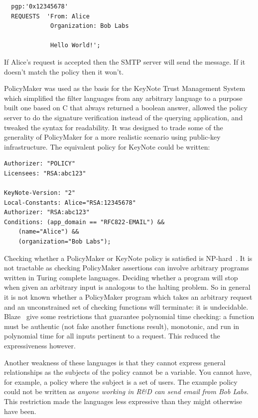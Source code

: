 \documentclass[thesis.tex]{subfiles}
\begin{document}
\begin{lstlisting}
  pgp:'0x12345678'
  REQUESTS  'From: Alice
             Organization: Bob Labs

             Hello World!';
\end{lstlisting}

If Alice's request is accepted then the SMTP server will send the
message.  If it doesn't match the policy then it won't.

PolicyMaker was used as the basis for the KeyNote Trust Management
System~\cite{blaze_role_1999,blaze_keynote:_1998} which simplified the
filter languages from any arbitrary language to a purpose built one
based on C that always returned a boolean answer, allowed the policy
server to do the signature verification instead of the querying
application, and tweaked the syntax for readability.  It was designed
to trade some of the generality of PolicyMaker for a more realistic
scenario using public-key infrastructure.  The equivalent policy for KeyNote could be written:

\begin{lstlisting}
Authorizer: "POLICY"
Licensees: "RSA:abc123"

KeyNote-Version: "2"
Local-Constants: Alice="RSA:12345678" 
Authorizer: "RSA:abc123"
Conditions: (app_domain == "RFC822-EMAIL") &&
    (name="Alice") &&
    (organization="Bob Labs");
\end{lstlisting}

Checking whether a PolicyMaker or KeyNote policy is satisfied is
NP-hard~\cite{blaze_compliance_1998}.  It is not tractable as checking
PolicyMaker assertions can involve arbitrary programs written in
Turing complete languages.  Deciding whether a program will stop when
given an arbitrary input is analogous to the halting problem.  So in
general it is not known whether a PolicyMaker program which takes an
arbitrary request and an unconstrained set of checking functions will
terminate: it is undecidable.  Blaze~\etal{} give
some restrictions that guarantee polynomial time checking: a function
must be authentic (not fake another functions result), monotonic, and
run in polynomial time for all inputs pertinent to a request.  This
reduced the expressiveness however.

Another weakness of these languages is that they cannot express
general relationships as the subjects of the policy cannot be a
variable.  You cannot have, for example, a policy where the subject is
a set of users.  The example policy could not be written as
\emph{anyone working in R\&D can send email from Bob Labs.}  This
restriction made the languages less expressive than they might
otherwise have been.
\end{document}
